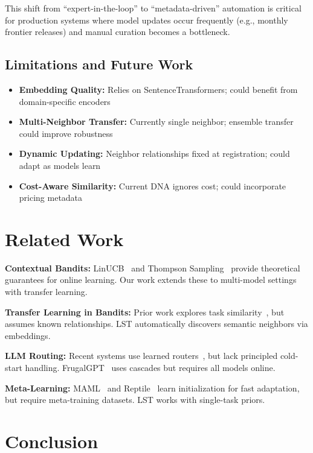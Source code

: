 \documentclass[sigconf,nonacm]{acmart}
\begin{document}
This shift from ``expert-in-the-loop'' to ``metadata-driven'' automation is critical for production systems where model updates occur frequently (e.g., monthly frontier releases) and manual curation becomes a bottleneck.

\subsection{Limitations and Future Work}

\begin{itemize}
    \item \textbf{Embedding Quality:} Relies on SentenceTransformers; could benefit from domain-specific encoders
    \item \textbf{Multi-Neighbor Transfer:} Currently single neighbor; ensemble transfer could improve robustness
    \item \textbf{Dynamic Updating:} Neighbor relationships fixed at registration; could adapt as models learn
    \item \textbf{Cost-Aware Similarity:} Current DNA ignores cost; could incorporate pricing metadata
\end{itemize}

\section{Related Work}

\textbf{Contextual Bandits:} LinUCB~\cite{li2010contextual} and Thompson Sampling~\cite{agrawal2013thompson} provide theoretical guarantees for online learning. Our work extends these to multi-model settings with transfer learning.

\textbf{Transfer Learning in Bandits:} Prior work explores task similarity~\cite{lazaric2008transfer}, but assumes known relationships. LST automatically discovers semantic neighbors via embeddings.

\textbf{LLM Routing:} Recent systems use learned routers~\cite{routellm2024,ding2024hybrid}, but lack principled cold-start handling. FrugalGPT~\cite{chen2023frugalgpt} uses cascades but requires all models online.

\textbf{Meta-Learning:} MAML~\cite{finn2017model} and Reptile~\cite{nichol2018first} learn initialization for fast adaptation, but require meta-training datasets. LST works with single-task priors.

\section{Conclusion}
\end{document}
